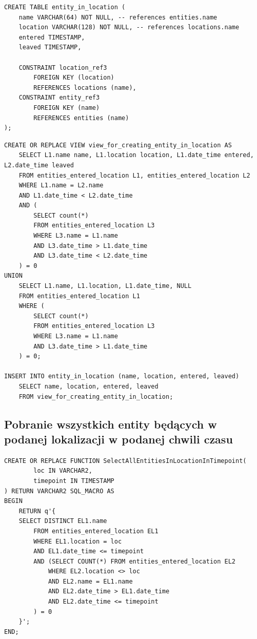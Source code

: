 \documentclass[11pt]{article}
\numberwithin{figure}{subsection}
\begin{document}
		\begin{lstlisting}[caption={Tablica zawierająca początek i koniec
		przebywania entity w lokalizacji}, captionpos=b]
CREATE TABLE entity_in_location (
	name VARCHAR(64) NOT NULL, -- references entities.name
	location VARCHAR(128) NOT NULL, -- references locations.name
	entered TIMESTAMP,
	leaved TIMESTAMP,
	
	CONSTRAINT location_ref3
		FOREIGN KEY (location)
		REFERENCES locations (name),
	CONSTRAINT entity_ref3
		FOREIGN KEY (name)
		REFERENCES entities (name)
);
		\end{lstlisting}
		
		\begin{lstlisting}[caption={Wypełnienie tablicy entity\_in\_location},
		captionpos=b]
CREATE OR REPLACE VIEW view_for_creating_entity_in_location AS
	SELECT L1.name name, L1.location location, L1.date_time entered, L2.date_time leaved
	FROM entities_entered_location L1, entities_entered_location L2
	WHERE L1.name = L2.name
	AND L1.date_time < L2.date_time
	AND (
		SELECT count(*)
		FROM entities_entered_location L3
		WHERE L3.name = L1.name
		AND L3.date_time > L1.date_time
		AND L3.date_time < L2.date_time
	) = 0
UNION
	SELECT L1.name, L1.location, L1.date_time, NULL
	FROM entities_entered_location L1
	WHERE (
		SELECT count(*)
		FROM entities_entered_location L3
		WHERE L3.name = L1.name
		AND L3.date_time > L1.date_time
	) = 0;

INSERT INTO entity_in_location (name, location, entered, leaved)
	SELECT name, location, entered, leaved
	FROM view_for_creating_entity_in_location;
		\end{lstlisting}
	
		
		
		
		
	\subsection{Pobranie wszystkich entity będących w podanej lokalizacji w
	podanej chwili czasu}
			
		\begin{lstlisting}[caption={Wersja niezoptymalizowana},captionpos=b]
CREATE OR REPLACE FUNCTION SelectAllEntitiesInLocationInTimepoint(
		loc IN VARCHAR2,
		timepoint IN TIMESTAMP
) RETURN VARCHAR2 SQL_MACRO AS
BEGIN
	RETURN q'{
	SELECT DISTINCT EL1.name
		FROM entities_entered_location EL1
		WHERE EL1.location = loc
		AND EL1.date_time <= timepoint
		AND (SELECT COUNT(*) FROM entities_entered_location EL2
			WHERE EL2.location <> loc
			AND EL2.name = EL1.name
			AND EL2.date_time > EL1.date_time
			AND EL2.date_time <= timepoint
		) = 0
	}';
END;
		\end{lstlisting}
		
\end{document}
